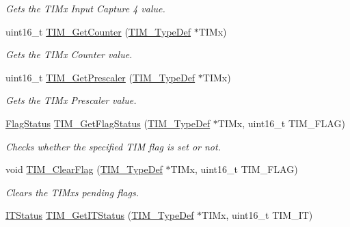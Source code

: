 \begin{DoxyCompactItemize}
\begin{DoxyCompactList}\small\item\em Gets the T\+I\+Mx Input Capture 4 value. \end{DoxyCompactList}\item 
uint16\+\_\+t \mbox{\hyperlink{group___t_i_m___exported___functions_gab6826b144ae70e206f51ae8af5318a93}{T\+I\+M\+\_\+\+Get\+Counter}} (\mbox{\hyperlink{struct_t_i_m___type_def}{T\+I\+M\+\_\+\+Type\+Def}} $\ast$T\+I\+Mx)
\begin{DoxyCompactList}\small\item\em Gets the T\+I\+Mx Counter value. \end{DoxyCompactList}\item 
uint16\+\_\+t \mbox{\hyperlink{group___t_i_m___exported___functions_ga427eb6e533480e02a27cd0ca876183d6}{T\+I\+M\+\_\+\+Get\+Prescaler}} (\mbox{\hyperlink{struct_t_i_m___type_def}{T\+I\+M\+\_\+\+Type\+Def}} $\ast$T\+I\+Mx)
\begin{DoxyCompactList}\small\item\em Gets the T\+I\+Mx Prescaler value. \end{DoxyCompactList}\item 
\mbox{\hyperlink{group___exported__types_ga89136caac2e14c55151f527ac02daaff}{Flag\+Status}} \mbox{\hyperlink{group___t_i_m___exported___functions_ga0adcbbd5e838ec8642e7a9b80075f41f}{T\+I\+M\+\_\+\+Get\+Flag\+Status}} (\mbox{\hyperlink{struct_t_i_m___type_def}{T\+I\+M\+\_\+\+Type\+Def}} $\ast$T\+I\+Mx, uint16\+\_\+t T\+I\+M\+\_\+\+F\+L\+AG)
\begin{DoxyCompactList}\small\item\em Checks whether the specified T\+IM flag is set or not. \end{DoxyCompactList}\item 
void \mbox{\hyperlink{group___t_i_m___exported___functions_ga46568c7b254941dc53e785342d60baf3}{T\+I\+M\+\_\+\+Clear\+Flag}} (\mbox{\hyperlink{struct_t_i_m___type_def}{T\+I\+M\+\_\+\+Type\+Def}} $\ast$T\+I\+Mx, uint16\+\_\+t T\+I\+M\+\_\+\+F\+L\+AG)
\begin{DoxyCompactList}\small\item\em Clears the T\+I\+Mx\textquotesingle{}s pending flags. \end{DoxyCompactList}\item 
\mbox{\hyperlink{group___exported__types_gaacbd7ed539db0aacd973a0f6eca34074}{I\+T\+Status}} \mbox{\hyperlink{group___t_i_m___exported___functions_ga0827a0b411707304f76d33050727c24d}{T\+I\+M\+\_\+\+Get\+I\+T\+Status}} (\mbox{\hyperlink{struct_t_i_m___type_def}{T\+I\+M\+\_\+\+Type\+Def}} $\ast$T\+I\+Mx, uint16\+\_\+t T\+I\+M\+\_\+\+IT)

\end{DoxyCompactItemize}
